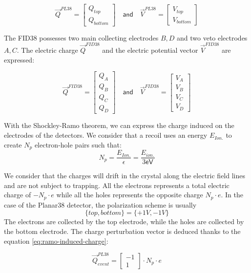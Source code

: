 \begin{equation}
\vec{Q}^{PL38} =
\begin{bmatrix}
Q_{top} \\ Q_{bottom}
\end{bmatrix}
\quad
\textsf{and}
\quad
\vec{V}^{PL38} =
\begin{bmatrix}
V_{top} \\ V_{bottom}
\end{bmatrix}
\end{equation}

The FID38 possesses two main collecting electrodes $B, D$ and two veto electrodes $A, C$. The electric charge $\vec{Q}^{FID38}$ and the electric potential vector $\vec{V}^{FID38}$ are expressed:

\begin{equation}
\vec{Q}^{FID38} =
\begin{bmatrix}
Q_{A} \\ Q_{B} \\ Q_{C} \\ Q_{D}
\end{bmatrix}
\quad
\textsf{and}
\quad
\vec{V}^{FID38} =
\begin{bmatrix}
V_{A} \\ V_{B} \\ V_{C} \\ V_{D}
\end{bmatrix}
\end{equation}

With the Shockley-Ramo theorem, we can express the charge induced on the electrodes of the detectors. We consider that a recoil uses an energy $E_{Ion.}$ to create $N_p$ electron-hole pairs such that:
\begin{equation}
N_p = \frac{E_{Ion.}}{\epsilon} = \frac{E_{ion.}}{3 \textsf{eV}}
\end{equation}

We consider that the charges will drift in the crystal along the electric field lines and are not subject to trapping. All the electrons represents a total electric charge of $- N_p \cdot e$ while all the holes represents the opposite charge $N_p \cdot e$.
In the case of the Planar38 detector, the polarization scheme is usually
$$ \{top, bottom\} = \{+1V, -1V\}$$
The electrons are collected by the top electrode, while the holes are collected by the bottom electrode. The charge perturbation vector is deduced thanks to the equation \ref{eq:ramo-induced-charge}:

\begin{equation}
\label{eq:plana38-induced-charges}
\vec{Q}_{event}^{PL38} =
\begin{bmatrix}
-1 \\ 1
\end{bmatrix}
\cdot N_p \cdot e
\end{equation}

